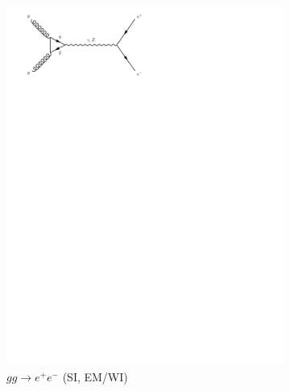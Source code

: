 \begin{figure}[h]
\begin{subfigure}[b]{0.3\textwidth}
    \includegraphics[trim={0.5cm 22cm 10cm 0cm},width=\textwidth]{../Diagrams/D2.pdf}
    \caption{$gg\rightarrow e^+e^-$ (SI, EM/WI)}
    \label{fey:2}
  \end{subfigure}%
  ~
  \begin{subfigure}[b]{0.3\textwidth}

\end{subfigure}
\end{figure}
